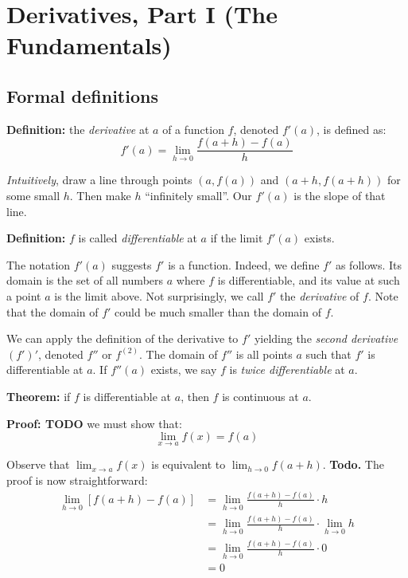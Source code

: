 
\section{Derivatives, Part I (The Fundamentals)}

\subsection{Formal definitions}

\textbf{Definition:} the \textit{derivative} at $a$ of a function $f$,
denoted $f'(a)$, is defined as:
\[f'(a)=\lim_{h\to0}\frac{f(a+h)-f(a)}{h}\]

\textit{Intuitively}, draw a line through points $(a, f(a))$ and
$(a+h, f(a+h))$ for some small $h$. Then make $h$ ``infinitely small''.
Our $f'(a)$ is the slope of that line.

\vs

\textbf{Definition:} $f$ is called \textit{differentiable} at $a$ if
the limit $f'(a)$ exists.

\vs

The notation $f'(a)$ suggests $f'$ is a function. Indeed, we define
$f'$ as follows. Its domain is the set of all numbers $a$ where $f$ is
differentiable, and its value at such a point $a$ is the limit above.
Not surprisingly, we call $f'$ the \textit{derivative} of $f$. Note
that the domain of $f'$ could be much smaller than the domain of $f$.

\vs

We can apply the definition of the derivative to $f'$ yielding the
\textit{second derivative} $(f')'$, denoted $f''$ or $f^{(2)}$. The
domain of $f''$ is all points $a$ such that $f'$ is differentiable at
$a$. If $f''(a)$ exists, we say $f$ is \textit{twice differentiable}
at $a$.

\vs

\textbf{Theorem:} if $f$ is differentiable at $a$, then $f$ is
continuous at $a$.

\textbf{Proof: TODO} we must show that:
\[\lim_{x\to a}f(x)=f(a)\]

Observe that $\lim_{x\to a}f(x)$ is equivalent to $\lim_{h\to 0}f(a+h)$.
\textbf{Todo.} The proof is now straightforward:
\begin{align*}
  \lim_{h\to0}[f(a+h)-f(a)]&=\lim_{h\to0}\frac{f(a+h)-f(a)}{h}\cdot h\\
                         &=\lim_{h\to0}\frac{f(a+h)-f(a)}{h}\cdot \lim_{h\to
                           0}h\\
                         &=\lim_{h\to0}\frac{f(a+h)-f(a)}{h}\cdot 0\\
                         &=0
\end{align*}

